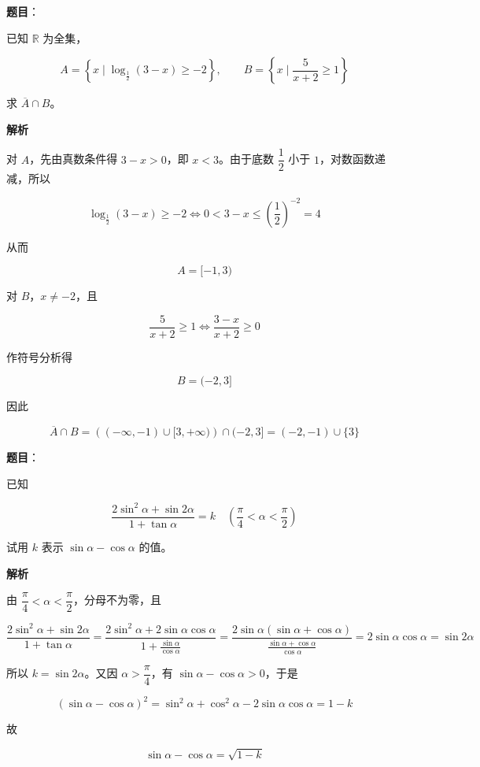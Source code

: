 \begin{answer}

\textbf{题目}：

已知 $\mathbb R$ 为全集，

\nopagebreak[4]
\[
A=\left\{x\mid\log_{\frac12}(3-x)\ge-2\right\},\qquad
B=\left\{x\mid\dfrac5{x+2}\ge1\right\}
\]

求 $\overline A\cap B$。

\textbf{解析}

对 $A$，先由真数条件得 $3-x>0$，即 $x<3$。由于底数 $\dfrac12$ 小于 $1$，对数函数递减，所以

\nopagebreak[4]
\[
\log_{\frac12}(3-x)\ge-2
\Longleftrightarrow
0<3-x\le\left(\frac12\right)^{-2}=4
\]

从而

\nopagebreak[4]
\[
A=[-1,3)
\]

对 $B$，$x\ne-2$，且

\nopagebreak[4]
\[
\frac5{x+2}\ge1
\Longleftrightarrow
\frac{3-x}{x+2}\ge0
\]

作符号分析得

\nopagebreak[4]
\[
B=(-2,3]
\]

因此

\nopagebreak[4]
\[
\overline A\cap B
=\left((-\infty,-1)\cup[3,+\infty)\right)\cap(-2,3]
=(-2,-1)\cup\{3\}
\]


\end{answer}
\begin{answer}

\textbf{题目}：

已知

\nopagebreak[4]
\[
\dfrac{2\sin^2\alpha+\sin2\alpha}{1+\tan\alpha}=k
\quad\left(\dfrac\pi4<\alpha<\dfrac\pi2\right)
\]

试用 $k$ 表示 $\sin\alpha-\cos\alpha$ 的值。

\textbf{解析}

由 $\dfrac\pi4<\alpha<\dfrac\pi2$，分母不为零，且

\nopagebreak[4]
\[
\frac{2\sin^2\alpha+\sin2\alpha}{1+\tan\alpha}
=\frac{2\sin^2\alpha+2\sin\alpha\cos\alpha}{1+\frac{\sin\alpha}{\cos\alpha}}
=\frac{2\sin\alpha(\sin\alpha+\cos\alpha)}
{\frac{\sin\alpha+\cos\alpha}{\cos\alpha}}
=2\sin\alpha\cos\alpha
=\sin2\alpha
\]

所以 $k=\sin2\alpha$。又因 $\alpha>\dfrac\pi4$，有 $\sin\alpha-\cos\alpha>0$，于是

\nopagebreak[4]
\[
(\sin\alpha-\cos\alpha)^2
=\sin^2\alpha+\cos^2\alpha-2\sin\alpha\cos\alpha
=1-k
\]

故

\nopagebreak[4]
\[
\sin\alpha-\cos\alpha=\sqrt{1-k}
\]


\end{answer}
